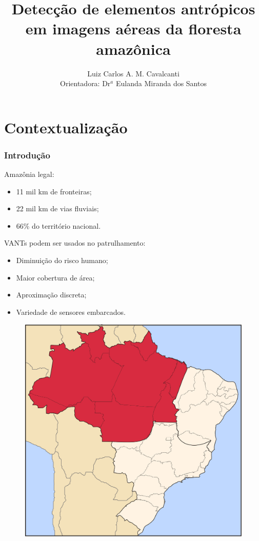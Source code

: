 \documentclass[t]{beamer}
\institute[Universities Here and There] %
{
  Programa de Pós-graduação em Informática\\
  Instituto de Computação\\
  Unversidade Federal do Amazonas
}
\title %
{Detecção de elementos antrópicos em imagens aéreas da floresta amazônica}
\author %
{Luiz Carlos A. M. Cavalcanti
\\Orientadora: Dr$^a$ Eulanda Miranda dos Santos} %
\date[] %
{}
\begin{document}
  \begin{frame}\titlepage\end{frame}


\section{Contextualização}

\begin{frame}[c]
\frametitle{Introdução}

	\begin{minipage}{0.7\linewidth}
		Amazônia legal:
		\begin{itemize}
			\item 11 mil km de fronteiras;
			\item 22 mil km de vias fluviais;
			\item 66\% do território nacional.
		\end{itemize}

		\vspace{0.5cm}

		VANTs podem ser usados no patrulhamento:
		\begin{itemize}
			\item Diminuição do risco humano;
			\item Maior cobertura de área;
			\item Aproximação discreta;
			\item Variedade de sensores embarcados.
		\end{itemize}
	\end{minipage}
	\begin{minipage}{0.28\linewidth}
		\begin{figure}[h]
			\includegraphics[width=\textwidth]{imgs/amazonia_legal}
		\end{figure}


\end{minipage}
\end{frame}
\end{document}
